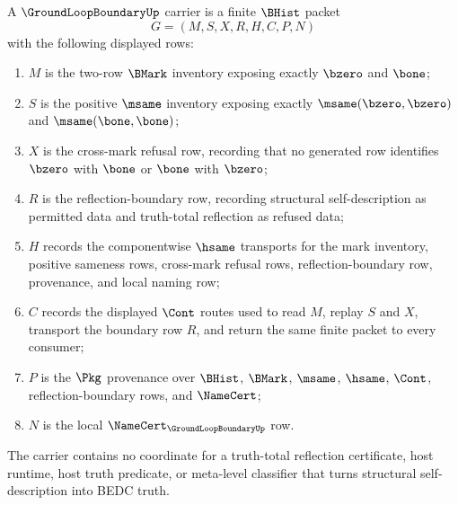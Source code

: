 \begin{definition}
\label{def:ground-loop-boundary-carrier}
A $\GroundLoopBoundaryUp$ carrier is a finite $\BHist$ packet
$$
G=(M,S,X,R,H,C,P,N)
$$
with the following displayed rows:
\begin{enumerate}
\item $M$ is the two-row $\BMark$ inventory exposing exactly $\bzero$ and $\bone$;
\item $S$ is the positive $\msame$ inventory exposing exactly $\msame(\bzero,\bzero)$ and $\msame(\bone,\bone)$;
\item $X$ is the cross-mark refusal row, recording that no generated row identifies $\bzero$ with $\bone$ or $\bone$ with $\bzero$;
\item $R$ is the reflection-boundary row, recording structural self-description as permitted data and truth-total reflection as refused data;
\item $H$ records the componentwise $\hsame$ transports for the mark inventory, positive sameness rows, cross-mark refusal rows, reflection-boundary row, provenance, and local naming row;
\item $C$ records the displayed $\Cont$ routes used to read $M$, replay $S$ and $X$, transport the boundary row $R$, and return the same finite packet to every consumer;
\item $P$ is the $\Pkg$ provenance over $\BHist$, $\BMark$, $\msame$, $\hsame$, $\Cont$, reflection-boundary rows, and $\NameCert$;
\item $N$ is the local $\NameCert_{\GroundLoopBoundaryUp}$ row.
\end{enumerate}
The carrier contains no coordinate for a truth-total reflection certificate, host runtime, host truth predicate, or meta-level classifier that turns structural self-description into BEDC truth.
\end{definition}

